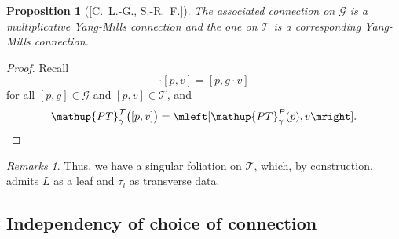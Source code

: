 \documentclass[
aspectratio=3218, 
10pt
]{beamer}
\def\bes{\begin{equation*}}
\def\ees{\end{equation*}}
\theoremstyle{plain}
\newtheorem{proposition}[theorem]{Proposition}
\theoremstyle{remark}
\newtheorem*{remark}{Remarks}
\begin{document}
{\begin{frame}
\end{frame}

\begin{frame}
\begin{proposition}[{[C.\ L.-G., S.-R.\ F.]}]\vspace{.5pt}
The associated connection on $\mathcal{G}$ is a multiplicative Yang-Mills connection and the one on $\mathcal{T}$ is a corresponding Yang-Mills connection.
\end{proposition}

\begin{proof}
Recall
\bes
[p, g] \cdot [p, v]
=
[p, g \cdot v]
\ees
for all $[p, g] \in \mathcal{G}$ and $[p, v] \in \mathcal{T}$, and
\bes
\mathup{PT}^{\mathcal{T}}_\gamma\bigl( [p, v] \bigr)
=
\mleft[ \mathup{PT}^{P}_\gamma(p), v \mright].
\ees
\end{proof}

\pause

\begin{remark}
Thus, we have a singular foliation on $\mathcal{T}$, which, by construction, admits $L$ as a leaf and $\tau_l$ as transverse data.
\end{remark}
\end{frame}

\subsection{Independency of choice of connection}


}
\end{document}
